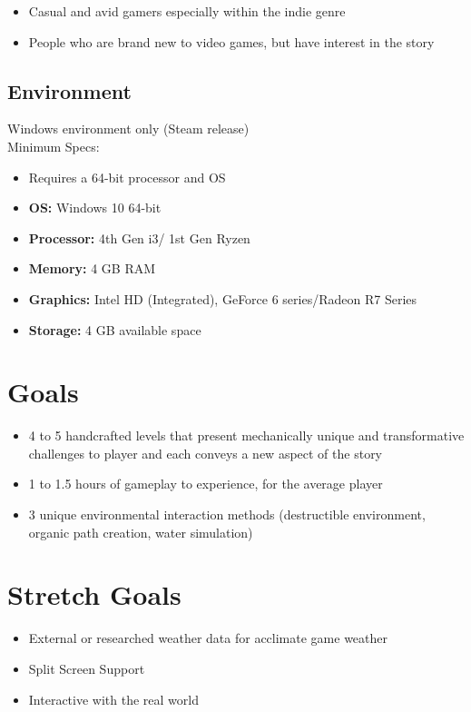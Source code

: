 \documentclass{article}
\begin{document}
\begin{itemize}
\item{Casual and avid gamers especially within the indie genre}
\item{People who are brand new to video games, but have interest in the story}
\end{itemize}

\subsection{Environment}

Windows environment only (Steam release)\\

Minimum Specs:
\begin{itemize}
\item{Requires a 64-bit processor and OS}
\item{\textbf{OS:} Windows 10 64-bit}
\item{\textbf{Processor:} 4th Gen i3/ 1st Gen Ryzen}
\item{\textbf{Memory:} 4 GB RAM}
\item{\textbf{Graphics:} Intel HD (Integrated), GeForce 6 series/Radeon R7 Series}
\item{\textbf{Storage:} 4 GB available space}
\end{itemize}


\section{Goals}

\begin{itemize}
\item{4 to 5 handcrafted levels that present mechanically unique and transformative challenges to player and each conveys a new aspect of the story}
\item{1 to 1.5 hours of gameplay to experience, for the average player}
\item{3 unique environmental interaction methods (destructible environment, organic path creation, water simulation)}
\end{itemize}

\section{Stretch Goals}

\begin{itemize}
\item{External or researched weather data for acclimate game weather}
\item{Split Screen Support}
\item{Interactive with the real world}
\end{itemize}
\end{document}
